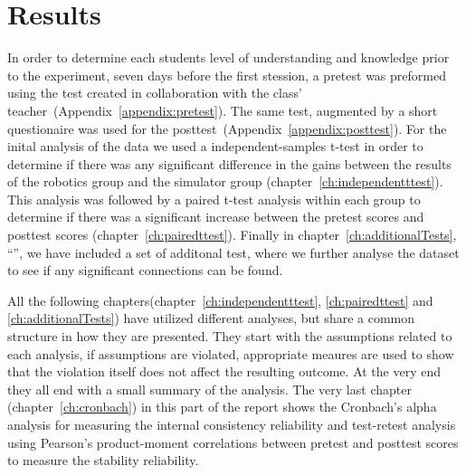 \chapter{Results}
In order to determine each students level of understanding and knowledge prior to the experiment, seven days before the first stession, a pretest was preformed using the test created in collaboration with the class' teacher~(Appendix~\ref{appendix:pretest}). 
The same test, augmented by a short questionaire was used for the posttest~(Appendix~\ref{appendix:posttest}).
For the inital analysis of the data we used a independent-samples t-test in order to determine if there was any
significant difference in the gains between the results of the robotics group and the simulator group (chapter~\ref{ch:independentttest}).
This analysis was followed by a paired t-test analysis within each group 
to determine if there was a significant increase between the pretest scores and posttest scores (chapter~\ref{ch:pairedttest}).
Finally in chapter~\ref{ch:additionalTests}, "`"', we have included a set of additonal test,
where we further analyse the dataset to see if any significant connections can be found. 

\bigskip\noindent
All the following chapters(chapter~\ref{ch:independentttest}, \ref{ch:pairedttest} and \ref{ch:additionalTests}) have utilized different analyses, but share a common structure in how they are presented.
They start with the assumptions related to each analysis, if assumptions are violated, appropriate meaures are used to show that the violation itself does not affect the resulting outcome.
At the very end they all end with a small summary of the analysis. 
The very last chapter (chapter~\ref{ch:cronbach}) in this part of the report shows the Cronbach's alpha analysis for measuring the internal consistency reliability and test-retest analysis using Pearson's product-moment correlations between pretest and posttest scores to measure the stability reliability.

